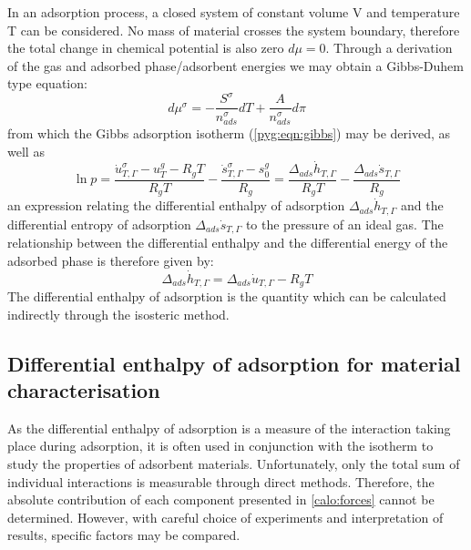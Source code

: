 In an adsorption process, a closed system of constant volume
V and temperature T can be considered. 
No mass of material crosses the system boundary,
therefore the total change in chemical potential is also
zero \(d\mu = 0\). Through
a derivation~\cite{rouquerolAdsorptionPowdersPorous2013} of the
gas and adsorbed phase/adsorbent energies we may obtain a
Gibbs-Duhem type equation:
%
\begin{equation}
	d \mu^{\sigma} = - \frac{S^{\sigma}}{n_{ads}^{\sigma}} dT + \frac{A}{n_{ads}^{\sigma}} d \pi
\end{equation}
%
from which the Gibbs adsorption isotherm (\autoref{pyg:eqn:gibbs}) may
be derived, as well as
%
\begin{equation}\label{calo:eqn:enthalpy}
	\ln p = \frac{\dot{u}_{T, \Gamma}^{\sigma} - u_T^g - R_gT}{R_gT} %
	- \frac{\dot{s}_{T, \Gamma}^{\sigma} - s^{g}_{0}}{R_g} %
	= \frac{\Delta_{ads} \dot{h}_{T, \Gamma}}{R_gT} - \frac{\Delta_{ads} \dot{s}_{T, \Gamma}}{R_g}
\end{equation}
%
an expression relating the differential enthalpy of adsorption
\(\Delta_{ads} \dot{h}_{T, \Gamma}\) and
the differential entropy of adsorption \(\Delta_{ads} \dot{s}_{T, \Gamma}\)
to the pressure of an ideal gas.
The relationship between the differential enthalpy and the differential energy
of the adsorbed phase is therefore given by:
%
\begin{equation}\label{calo:eqn:adj}
	\Delta_{ads} \dot{h}_{T, \Gamma} = \Delta_{ads} \dot{u}_{T, \Gamma} - R_gT
\end{equation}
%
The differential enthalpy of adsorption is the quantity which
can be calculated indirectly through the isosteric method.

\subsection{Differential enthalpy of adsorption for material characterisation}

As the differential enthalpy of adsorption is a measure
of the interaction taking place during adsorption, it is often
used in conjunction with the isotherm to study the properties
of adsorbent materials.
Unfortunately, only the total sum of individual interactions
is measurable through direct methods. Therefore, the
absolute contribution of each component presented in
\autoref{calo:forces} cannot be determined.
However, with careful choice of experiments and interpretation
of results, specific factors may be compared.

